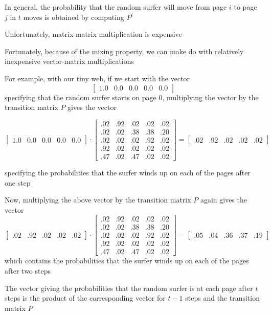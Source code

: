 \documentclass[8pt,a4paper,compress]{beamer}
\begin{document}
\begin{frame}[fragile]
\pause

In general, the probability that the random surfer will move from page $i$ to page $j$ in $t$ moves is obtained by computing $P^t$ 

\pause
\bigskip 

Unfortunately, matrix-matrix multiplication is expensive

\pause
\bigskip

Fortunately, because of the mixing property, we can make do with relatively inexpensive vector-matrix multiplications

\pause
\bigskip

For example, with our tiny web, if we start with the vector 
\[
\begin{bmatrix}
1.0 & 0.0 & 0.0 & 0.0 & 0.0
\end{bmatrix}
\]
specifying that the random surfer starts on page 0, multiplying the vector by the transition matrix $P$ gives the vector 

\[
\begin{bmatrix}
1.0 & 0.0 & 0.0 & 0.0 & 0.0
\end{bmatrix}
\cdot
\begin{bmatrix}
.02 & .92 & .02 & .02 & .02 \\
.02 & .02 & .38 & .38 & .20 \\
.02 & .02 & .02 & .92 & .02 \\
.92 & .02 & .02 & .02 & .02 \\
.47 & .02 & .47 & .02 & .02
\end{bmatrix} = 
\begin{bmatrix}
.02 & .92 & .02 & .02 & .02
\end{bmatrix}
\]

specifying the probabilities that the surfer winds up on each of the pages after one step
\end{frame}

\begin{frame}[fragile]
\pause

Now, multiplying the above vector by the transition matrix $P$ again gives the vector
\[
\begin{bmatrix}
.02 & .92 & .02 & .02 & .02
\end{bmatrix}
\cdot
\begin{bmatrix}
.02 & .92 & .02 & .02 & .02 \\
.02 & .02 & .38 & .38 & .20 \\
.02 & .02 & .02 & .92 & .02 \\
.92 & .02 & .02 & .02 & .02 \\
.47 & .02 & .47 & .02 & .02
\end{bmatrix} =
\begin{bmatrix}
.05 & .04 & .36 & .37 & .19
\end{bmatrix}
\]
which contains the probabilities that the surfer winds up on each of the pages after two steps

\pause
\bigskip

The vector giving the probabilities that the random surfer is at each page after $t$ steps is the product of the corresponding vector for $t-1$ steps and the transition matrix $P$
\end{frame}
\end{document}
